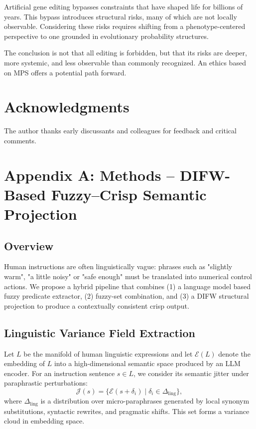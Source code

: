 \documentclass[11pt]{article}
\begin{document}
Artificial gene editing bypasses constraints that have shaped life for billions of years. This bypass introduces structural risks, many of which are not locally observable. Considering these risks requires shifting from a phenotype-centered perspective to one grounded in evolutionary probability structures.

The conclusion is not that all editing is forbidden, but that its risks are deeper, more systemic, and less observable than commonly recognized. An ethics based on MPS offers a potential path forward.

\section*{Acknowledgments}
The author thanks early discussants and colleagues for feedback and critical comments.

\appendix
\section{Appendix A: Methods -- DIFW-Based Fuzzy--Crisp Semantic Projection}

\subsection{Overview}

Human instructions are often linguistically vague: phrases such as "slightly warm", "a little noisy" or
"safe enough" must be translated into numerical control actions. We propose a hybrid pipeline that
combines (1) a language model based fuzzy predicate extractor, (2) fuzzy-set combination, and
(3) a DIFW structural projection to produce a contextually consistent crisp output.

\subsection{Linguistic Variance Field Extraction}

Let $L$ be the manifold of human linguistic expressions and let
$\mathcal{E}(L)$ denote the embedding of $L$ into a high-dimensional semantic
space produced by an LLM encoder. For an instruction sentence $s \in L$, we consider its semantic jitter under
paraphrastic perturbations:
\[
\mathcal{J}(s) = \{ \mathcal{E}(s + \delta_i) \mid \delta_i \in \Delta_{\mathrm{ling}} \},
\]
where $\Delta_{\mathrm{ling}}$ is a distribution over micro-paraphrases
generated by local synonym substitutions, syntactic rewrites, and pragmatic
shifts. This set forms a variance cloud in embedding space.
\end{document}
